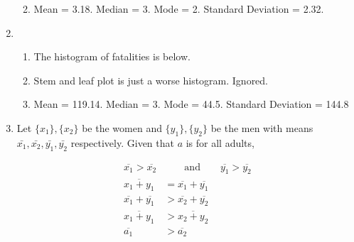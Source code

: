 \begin{enumerate}
\begin{enumerate}
		\begin{figure}[H]
			\centering
		\end{figure}
		
		\item Mean = 3.18. Median = 3. Mode = 2. Standard Deviation = 2.32.
		
		
	\end{enumerate}
	
	\item \begin{enumerate}
		\item The histogram of fatalities is below. \\
		\begin{figure}[H]
			\centering
		\end{figure}
		
		\item Stem and leaf plot is just a worse histogram. Ignored.
		\item Mean = 119.14. Median = 3. Mode = 44.5. Standard Deviation = 144.8
	\end{enumerate}
	
	\item Let $ \{x_1\} , \{x_2\} $ be the women and $ \{y_1\} , \{y_2\} $ be the men with means $ \bar{x_1}, \bar{x_2}, \bar{y_1}, \bar{y_2} $ respectively. Given that $ a $ is for all adults,
	
		\begin{align}
			\overline{x_1} > \overline{x_2} &\qquad \text{and} \qquad \overline{y_1} > \overline{y_2} \\
			\overline{x_1 + y_1} &= \overline{x_1} + \overline{y_1} \\
			\overline{x_1} + \overline{y_1} &> \overline{x_2} + \overline{y_2} \\
			\overline{x_1 + y_1} &> \overline{x_2 + y_2} \\
			\overline{a_1} &> \overline{a_2}
		\end{align}
		

\end{enumerate}
